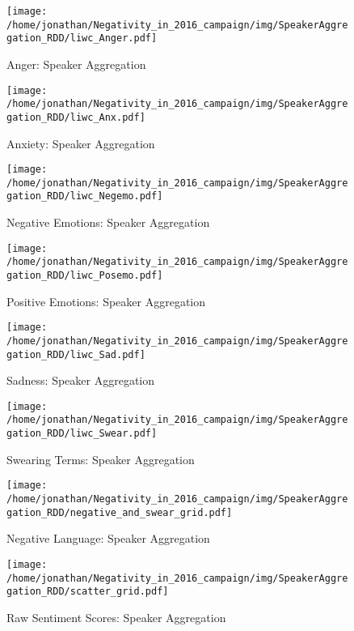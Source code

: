 \begin{figure}[h]\centering
	\texttt{[image: /home/jonathan/Negativity\_in\_2016\_campaign/img/SpeakerAggregation\_RDD/liwc\_Anger.pdf]}
	\caption{Anger: Speaker Aggregation}
	\label{fig: sa_Anger}
\end{figure}

\begin{figure}[h]\centering
	\texttt{[image: /home/jonathan/Negativity\_in\_2016\_campaign/img/SpeakerAggregation\_RDD/liwc\_Anx.pdf]}
	\caption{Anxiety: Speaker Aggregation}
	\label{fig: sa_Anxiety}
\end{figure}

\begin{figure}[h]\centering
	\texttt{[image: /home/jonathan/Negativity\_in\_2016\_campaign/img/SpeakerAggregation\_RDD/liwc\_Negemo.pdf]}
	\caption{Negative Emotions: Speaker Aggregation}
	\label{fig: sa_Negative Emotions}
\end{figure}

\begin{figure}[h]\centering
	\texttt{[image: /home/jonathan/Negativity\_in\_2016\_campaign/img/SpeakerAggregation\_RDD/liwc\_Posemo.pdf]}
	\caption{Positive Emotions: Speaker Aggregation}
	\label{fig: sa_Positive Emotions}
\end{figure}

\begin{figure}[h]\centering
	\texttt{[image: /home/jonathan/Negativity\_in\_2016\_campaign/img/SpeakerAggregation\_RDD/liwc\_Sad.pdf]}
	\caption{Sadness: Speaker Aggregation}
	\label{fig: sa_Sadness}
\end{figure}

\begin{figure}[h]\centering
	\texttt{[image: /home/jonathan/Negativity\_in\_2016\_campaign/img/SpeakerAggregation\_RDD/liwc\_Swear.pdf]}
	\caption{Swearing Terms: Speaker Aggregation}
	\label{fig: sa_Swearing Terms}
\end{figure}

\begin{figure}[h]\centering
	\texttt{[image: /home/jonathan/Negativity\_in\_2016\_campaign/img/SpeakerAggregation\_RDD/negative\_and\_swear\_grid.pdf]}
	\caption{Negative Language: Speaker Aggregation}
	\label{fig: sa_Negative Language}
\end{figure}

\begin{figure}[h]\centering
	\texttt{[image: /home/jonathan/Negativity\_in\_2016\_campaign/img/SpeakerAggregation\_RDD/scatter\_grid.pdf]}
	\caption{Raw Sentiment Scores: Speaker Aggregation}
	\label{fig: sa_Raw Sentiment Scores}
\end{figure}

